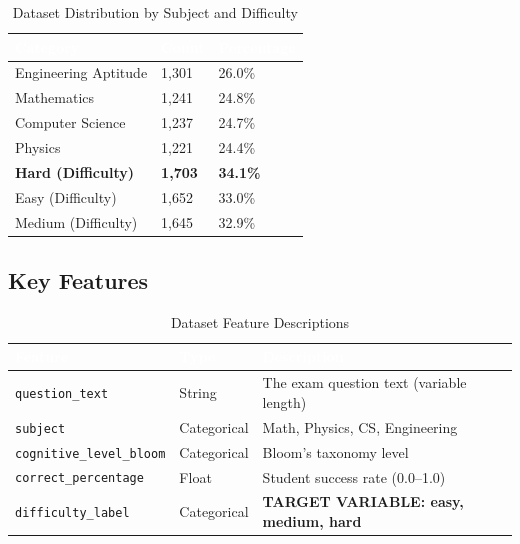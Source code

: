 \documentclass[12pt,a4paper]{article}
\begin{document}
\begin{table}[H]
\centering
\begin{tabular}{|L{5cm}|C{3cm}|C{3cm}|}
\hline
{}
\textcolor{white}{\textbf{Category}} &
\textcolor{white}{\textbf{Count}} &
\textcolor{white}{\textbf{Percentage}} \\
\hline
Engineering Aptitude & 1,301 & 26.0\% \\
\hline
{}
Mathematics & 1,241 & 24.8\% \\
\hline
Computer Science & 1,237 & 24.7\% \\
\hline
{}
Physics & 1,221 & 24.4\% \\
\hline
\textbf{Hard (Difficulty)} & \textbf{1,703} & \textbf{34.1\%} \\
\hline
{}
Easy (Difficulty) & 1,652 & 33.0\% \\
\hline
Medium (Difficulty) & 1,645 & 32.9\% \\
\hline
\end{tabular}
\caption{Dataset Distribution by Subject and Difficulty}
\end{table}

\subsection{Key Features}

\begin{table}[H]
\centering
\begin{tabular}{|L{4cm}|L{2.5cm}|L{6.5cm}|}
\hline
{}
\textcolor{white}{\textbf{Feature}} &
\textcolor{white}{\textbf{Type}} &
\textcolor{white}{\textbf{Description}} \\
\hline
\texttt{question\_text} & String & The exam question text (variable length) \\
\hline
{}
\texttt{subject} & Categorical & Math, Physics, CS, Engineering \\
\hline
\texttt{cognitive\_level\_bloom} & Categorical & Bloom's taxonomy level \\
\hline
{}
\texttt{correct\_percentage} & Float & Student success rate (0.0--1.0) \\
\hline
\texttt{difficulty\_label} & Categorical & \textbf{TARGET VARIABLE: easy, medium, hard} \\
\hline
\end{tabular}
\caption{Dataset Feature Descriptions}
\end{table}
\end{document}
